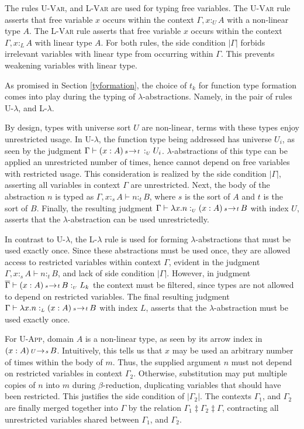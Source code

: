\documentclass{article}
\theoremstyle{definition}
\newcommand{\rname}[1]{\textsc{\footnotesize #1}}
\newcommand{\pure}[1]{|#1|}
\newcommand{\utype}{:_{\scriptscriptstyle U}}
\newcommand{\ltype}{:_{\scriptscriptstyle L}}
\newcommand{\stype}[1]{:_#1}
\newcommand{\mrg}[3]{#1\ddagger#2\ddagger#3}
\newcommand{\arw}[2]
{\hspace*{0.2em}{\scriptstyle #1}\hspace*{-0.2em}
\rightarrow
\hspace*{-0.2em}{\scriptstyle #2}\hspace*{0.2em}}
\begin{document}
  The rules \rname{U-Var}, and \rname{L-Var} are used for typing free variables. The \rname{U-Var} rule asserts that free variable $x$ occurs within the context $\Gamma, x \utype A$ with a non-linear type $A$. The \rname{L-Var} rule asserts that free variable $x$ occurs within the context $\Gamma, x \ltype A$ with linear type $A$. For both rules, the side condition $\pure{\Gamma}$ forbids irrelevant variables with linear type from occurring within $\Gamma$. This prevents weakening variables with linear type.

  As promised in Section \ref{tyformation}, the choice of $t_k$ for function type formation comes into play during the typing of $\lambda$-abstractions. Namely, in the pair of rules \rname{U-$\lambda$}, and \rname{L-$\lambda$}.

  By design, types with universe sort $U$ are non-linear, terms with these types enjoy unrestricted usage. In \rname{U-$\lambda$}, the function type being addressed has universe $U_i$, as seen by the judgment $\Gamma \vdash (x : A) \arw{s}{t} \utype U_i$. $\lambda$-abstractions of this type can be applied an unrestricted number of times, hence cannot depend on free variables with restricted usage. This consideration is realized by the side condition $\pure{\Gamma}$, asserting all variables in context $\Gamma$ are unrestricted. Next, the body of the abstraction $n$ is typed as $\Gamma, x \stype{s} A \vdash n \stype{t} B$, where $s$ is the sort of $A$ and $t$ is the sort of $B$. Finally, the resulting judgment $\Gamma \vdash \lambda x.n \utype (x : A) \arw{s}{t} B$ with index $U$, asserts that the $\lambda$-abstraction can be used unrestrictedly.

  In contrast to \rname{U-$\lambda$}, the \rname{L-$\lambda$} rule is used for forming $\lambda$-abstractions that must be used exactly once. Since these abstractions must be used once, they are allowed access to restricted variables within context $\Gamma$, evident in the judgment $\Gamma, x \stype{s} A \vdash n \stype{t} B$, and lack of side condition $\pure{\Gamma}$. However, in judgment $\overline{\Gamma} \vdash (x : A) \arw{s}{t} B \utype L_k$ the context must be filtered, since types are not allowed to depend on restricted variables. The final resulting judgment $\Gamma \vdash \lambda x.n \ltype (x : A) \arw{s}{t} B$ with index $L$, asserts that the $\lambda$-abstraction must be used exactly once.
  
  For \rname{U-App}, domain $A$ is a non-linear type, as seen by its arrow index in $(x : A) \arw{U}{s} B$. Intuitively, this tells us that $x$ may be used an arbitrary number of times within the body of $m$. Thus, the supplied argument $n$ must not depend on restricted variables in context $\Gamma_2$. Otherwise, substitution may put multiple copies of $n$ into $m$ during $\beta$-reduction, duplicating variables that should have been restricted. This justifies the side condition of $\pure{\Gamma_2}$. The contexts $\Gamma_1$, and $\Gamma_2$ are finally merged together into $\Gamma$ by the relation $\mrg{\Gamma_1}{\Gamma_2}{\Gamma}$, contracting all unrestricted variables shared between $\Gamma_1$, and $\Gamma_2$.
  
\end{document}
